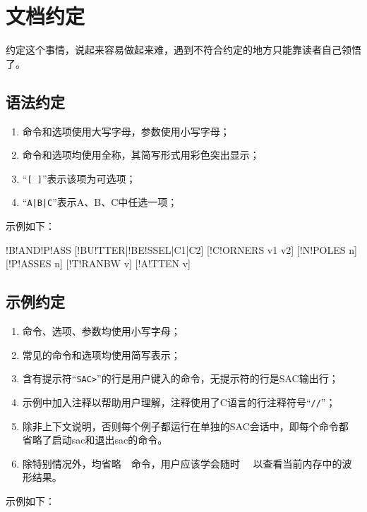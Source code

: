 \section{文档约定}
约定这个事情，说起来容易做起来难，遇到不符合约定的地方只能靠读者自己领悟了。

\subsection*{语法约定}
\begin{enumerate}
\item 命令和选项使用大写字母，参数使用小写字母；
\item 命令和选项均使用全称，其简写形式用彩色突出显示；
\item ``\lstinline{[ ]}''表示该项为可选项；
\item ``\lstinline{A|B|C}''表示A、B、C中任选一项；
\end{enumerate}

示例如下：
\begin{SACSTX}
!B!AND!P!ASS [!BU!TTER|!BE!SSEL|C1|C2] [!C!ORNERS v1 v2] [!N!POLES n] 
    [!P!ASSES n] [!T!RANBW v] [!A!TTEN v]
\end{SACSTX}

\subsection*{示例约定}
\begin{enumerate}
\item 命令、选项、参数均使用小写字母；
\item 常见的命令和选项均使用简写表示；
\item 含有提示符``\lstinline{SAC>}''的行是用户键入的命令，无提示符的行是SAC输出行；
\item 示例中加入注释以帮助用户理解，注释使用了C语言的行注释符号``\lstinline{//}''；
\item 除非上下文说明，否则每个例子都运行在单独的SAC会话中，即每个命令都
    省略了启动sac和退出sac的命令。
\item 除特别情况外，均省略~~命令，用户应该学会随时~~
    以查看当前内存中的波形结果。
\end{enumerate}

示例如下：
